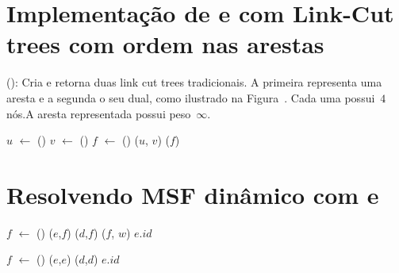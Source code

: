 \section{Implementação de \LCOSplice{} e \LCOMakeEdge{} com Link-Cut trees com ordem nas arestas}
\LCOMakeEdge(): Cria e retorna duas link cut trees tradicionais. A primeira representa uma aresta e a segunda o seu dual, como ilustrado na Figura~. Cada uma possui~$4$ nós.A aresta representada possui peso~$\infty$.


\LCOSplice{}


\begin{algorithm}[htb]
\caption{\LCOMakeEdge()}
\label{Algo:LCOMakeEdge}
\begin{algorithmic}[1]
\State $u$ $\gets$ \LCOMakeNode()
\State $v$ $\gets$ \LCOMakeNode()
\State $f$ $\gets$ \LCOMakeNode()
\State \LCOLink($u$, $v$)
\State \LCOLoop($f$)
\end{algorithmic}
\end{algorithm}

\section{Resolvendo MSF dinâmico com \LCOSplice{} e \LCOMakeEdge{}}




\begin{algorithm}[htb]
\caption{\MSFaddEdge($e$, $d$, $w$)}
\label{Algo:MSFaddEdge}
\begin{algorithmic}[1]
\State $f$ $\gets$ \LCOMakeEdge()
\State \LCOSplice($e$,$f$)
\State \LCOSplice($d$,$f$)
\State \MSFupdate($f$, $w$)
\State \Return $e$.$id$ 
\end{algorithmic}
\end{algorithm}


\begin{algorithm}[htb]
\caption{\MSFdelEdge($e$, $d$)}
\label{Algo:MSFdelEdge}
\begin{algorithmic}[1]
\State $f$ $\gets$ \LCOMakeEdge()
\State \LCOSplice($e$,$e$)
\State \LCOSplice($d$,$d$)
\State \Return $e$.$id$ 
\end{algorithmic}
\end{algorithm}
